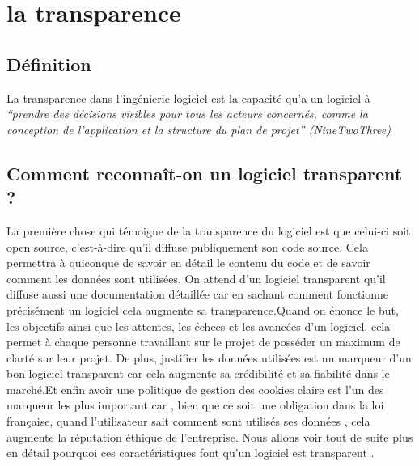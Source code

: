 \documentclass{article}
\begin{document}
\section{la transparence } 
\subsection{Définition}
La transparence dans l’ingénierie logiciel est la capacité qu’a un logiciel à \textit{“prendre des décisions visibles pour tous les acteurs concernés, comme la conception de l'application et la structure du plan de projet” (NineTwoThree)}\cite{def_transparence}
\subsection{Comment reconnaît-on un logiciel transparent ?}
La première chose qui témoigne de la transparence du logiciel est que celui-ci soit open source, c'est-à-dire qu’il diffuse publiquement son code source. Cela  permettra à quiconque de savoir en détail le contenu du code et de savoir comment les données sont utilisées.
On attend d’un logiciel transparent qu’il diffuse aussi une documentation détaillée car en sachant comment fonctionne précisément un logiciel cela augmente sa transparence.Quand on  énonce le but, les objectifs ainsi que les attentes, les échecs et les avancées  d’un logiciel, cela permet à chaque personne travaillant sur le projet de posséder un maximum de clarté sur leur projet. De plus, justifier les données utilisées est un marqueur d’un bon logiciel transparent \cite{importance_transparence} car cela augmente sa crédibilité et sa fiabilité dans le marché.Et enfin avoir une politique de gestion des cookies claire est l’un des marqueur  les plus important car , bien que ce soit une obligation dans la loi française, quand l’utilisateur sait comment sont utilisés ses données , cela augmente la réputation éthique de l’entreprise.
Nous allons voir tout de suite plus en détail pourquoi ces caractéristiques font qu’un logiciel est transparent  .
\end{document}
